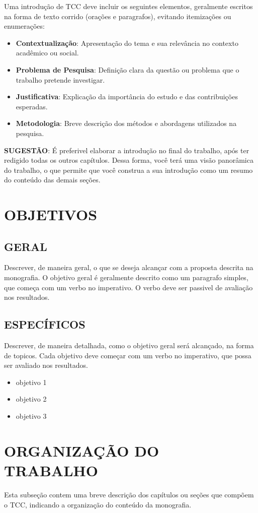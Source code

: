 


Uma introdução de TCC deve incluir os seguintes elementos, geralmente escritos na forma de texto corrido (orações e paragrafos), evitando itemizações ou enumerações:

\begin{itemize}
    \item \textbf{Contextualização}: Apresentação do tema e sua relevância no contexto acadêmico ou social.        
    \item \textbf{Problema de Pesquisa}: Definição clara da questão ou problema que o trabalho pretende investigar.
    \item \textbf{Justificativa}: Explicação da importância do estudo e das contribuições esperadas.
    \item \textbf{Metodologia}: Breve descrição dos métodos e abordagens utilizados na pesquisa.    
\end{itemize}

\textbf{SUGESTÃO}: É preferivel elaborar a introdução no final do trabalho, após ter redigido todas os outros capítulos. Dessa forma, você terá uma visão panorâmica do trabalho, o que permite que você construa a sua introdução como um resumo do conteúdo das demais seções.

\section{OBJETIVOS}

\subsection{\MakeTextUppercase{GERAL}}
Descrever, de maneira geral, o que se deseja alcançar com a proposta descrita na monografia. O objetivo geral é geralmente descrito como um paragrafo simples, que começa com um verbo no imperativo. O verbo deve ser passivel de avaliação nos resultados.

\subsection{\MakeTextUppercase{ESPECÍFICOS}}
Descrever, de maneira detalhada, como o objetivo geral será alcançado, na forma de topicos. Cada objetivo deve começar com um verbo no imperativo, que possa ser avaliado nos resultados.

\begin{itemize}
\item objetivo 1
\item objetivo 2
\item objetivo 3
\end{itemize}

\section{ORGANIZAÇÃO DO TRABALHO}

Esta subseção contem uma breve descrição dos capítulos ou seções que compõem o TCC, indicando a organização do conteúdo da monografia.

